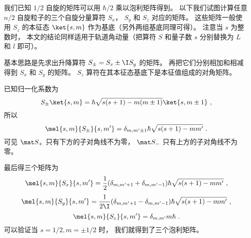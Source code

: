 

我们已知 $1/2$ 自旋的矩阵可以用 $\hbar/2$ 乘以泡利矩阵得到。 以下我们试图计算任意 $n/2$ 自旋粒子的三个自旋分量算符 $S_x$， $S_y$ 和 $S_z$ 对应的矩阵。 这些矩阵一般使用 $S_z$ 的本征态 $\ket{s, m}$ 作为基底（另外两组基底同理可得）。 注意当 $s$ 为整数时， 本文的结论同样适用于轨道角动量（把算符 $S$ 和量子数 $s$ 分别替换为 $L$ 和 $l$ 即可）。

基本思路是先求出升降算符 $S_\pm = S_x \pm \I S_y$ 的矩阵。 再把它们分别相加和相减得到 $S_x$ 和 $S_y$ 的矩阵。 $S_z$ 算符在其本征态基底下是本征值组成的对角矩阵。

已知归一化系数为
\begin{equation}
S_\pm \ket{s,m} = \hbar \sqrt{s(s + 1) - m(m \pm 1)} \ket{s,m\pm1}~,
\end{equation}
所以
\begin{equation}
\mel{s,m}{S_\pm}{s,m'} = \delta_{m, m'\pm1} \hbar \sqrt{s(s + 1) - mm'}~.
\end{equation}
可见 $\mat S_+$ 只有下方的子对角线不为零， $\mat S_-$ 只有上方的子对角线不为零。

最后得三个矩阵为
\begin{equation}
\mel{s,m}{S_x}{s,m'} = \frac12(\delta_{m, m'+1} + \delta_{m, m'-1})\hbar \sqrt{s(s + 1) - mm'} ~,
\end{equation}
\begin{equation}
\mel{s,m}{S_y}{s,m'} = \frac{1}{2\I}(\delta_{m, m'+1} - \delta_{m, m'-1}) \hbar \sqrt{s(s + 1) - mm'}~,
\end{equation}
\begin{equation}
\mel{s,m}{S_z}{s,m'} = \delta_{m,m'} m\hbar ~.
\end{equation}
可以验证当 $s = 1/2, m = \pm1/2$ 时， 我们就得到了三个泡利矩阵。
